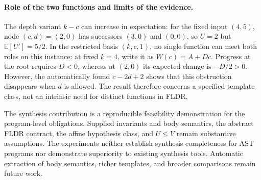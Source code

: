 \paragraph{Role of the two functions and limits of the evidence.}
The depth variant $k-c$ can increase in expectation: for the fixed input
$(4,5)$, node $(c,d)=(2,0)$ has successors $(3,0)$ and $(0,0)$,
so $U=2$ but $\mathbb{E}[U']=5/2$. In the restricted basis $(k,c,1)$,
no single function can meet both roles on this instance: at fixed $k=4$,
write it as $W(c)=A+Dc$. Progress at the root requires $D<0$, whereas
at $(2,0)$ its expected change is $-D/2>0$. However, the automatically
found $c-2d+2$ shows that this obstruction disappears when $d$ is allowed.
The result therefore concerns a specified template class, not an intrinsic
need for distinct functions in FLDR.

The synthesis contribution is a reproducible feasibility demonstration
for the program-level obligations. Supplied invariants and body semantics,
the abstract FLDR contract, the affine hypothesis class, and $U\leq V$
remain substantive assumptions. The experiments neither establish
synthesis completeness for AST programs nor demonstrate superiority to
existing synthesis tools. Automatic extraction of body semantics, richer
templates, and broader comparisons remain future work.
